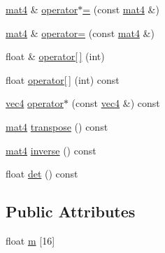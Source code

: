 \begin{DoxyCompactItemize}
\item 
\hyperlink{structmat4}{mat4} \& \hyperlink{structmat4_a480d75ddc6c5b4cd52f96eb9bde7966a}{operator$\ast$=} (const \hyperlink{structmat4}{mat4} \&)
\item 
\hyperlink{structmat4}{mat4} \& \hyperlink{structmat4_a22fc670708db72d05fc55bf02ad9bdcf}{operator=} (const \hyperlink{structmat4}{mat4} \&)
\item 
float \& \hyperlink{structmat4_ad4b21a373faeca027b94e0dce7f215ed}{operator\mbox{[}$\,$\mbox{]}} (int)
\item 
float \hyperlink{structmat4_a6fc70cc7bcabfc7127aef3a2a5cffaaa}{operator\mbox{[}$\,$\mbox{]}} (int) const 
\item 
\hyperlink{structvec4}{vec4} \hyperlink{structmat4_a74d5aa4c7f0bb9b4061551fbb06c120e}{operator$\ast$} (const \hyperlink{structvec4}{vec4} \&) const 
\item 
\hyperlink{structmat4}{mat4} \hyperlink{structmat4_aab816366c2233c95eac70b2eab11e8e2}{transpose} () const 
\item 
\hyperlink{structmat4}{mat4} \hyperlink{structmat4_a90efa7f6bcd321d1433629c8e6c09af3}{inverse} () const 
\item 
float \hyperlink{structmat4_a80b3a218af52e2cdcc5a216bfaa064b7}{det} () const 
\end{DoxyCompactItemize}
\subsection*{Public Attributes}
\begin{DoxyCompactItemize}
\item 
float \hyperlink{structmat4_ab424bc8677a83f16bd30f4eaaecb6d3a}{m} \mbox{[}16\mbox{]}
\end{DoxyCompactItemize}


